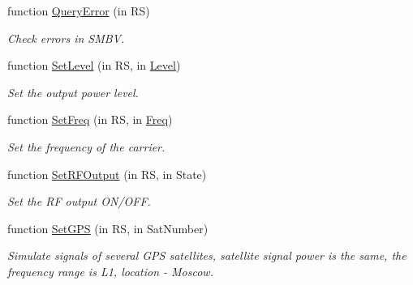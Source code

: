 \begin{DoxyCompactItemize}
function \hyperlink{class_c_s_m_b_v_a6be4429d47f5da0aa82423fdb77eb990}{Query\-Error} (in R\-S)
\begin{DoxyCompactList}\small\item\em Check errors in S\-M\-B\-V. \end{DoxyCompactList}\item 
function \hyperlink{class_c_s_m_b_v_a2b45f1a385538046a8b9da1ee79a5186}{Set\-Level} (in R\-S, in \hyperlink{class_c_s_m_b_v_aa7f7138c5ee0adb847b7450aed49cfcc}{Level})
\begin{DoxyCompactList}\small\item\em Set the output power level. \end{DoxyCompactList}\item 
function \hyperlink{class_c_s_m_b_v_a1a41ea8f1e690462194823077b3bf422}{Set\-Freq} (in R\-S, in \hyperlink{class_c_s_m_b_v_a2e492ee90610c51ccb4eb206c788dbca}{Freq})
\begin{DoxyCompactList}\small\item\em Set the frequency of the carrier. \end{DoxyCompactList}\item 
function \hyperlink{class_c_s_m_b_v_a4e2bf2f6e9a782439dc5dc0915ee29ff}{Set\-R\-F\-Output} (in R\-S, in State)
\begin{DoxyCompactList}\small\item\em Set the R\-F output O\-N/\-O\-F\-F. \end{DoxyCompactList}\item 
function \hyperlink{class_c_s_m_b_v_a2f597f1c5a83db80d1f6d70c27cd66a1}{Set\-G\-P\-S} (in R\-S, in Sat\-Number)
\begin{DoxyCompactList}\small\item\em Simulate signals of several G\-P\-S satellites, satellite signal power is the same, the frequency range is L1, location -\/ Moscow. \end{DoxyCompactList}\end{DoxyCompactItemize}
